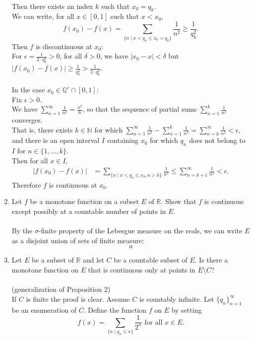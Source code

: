\begin{enumerate}
    \\Then there exists an index $k$ such that $x_0=q_k$.
    \\We can write, for all $x\in[0,1]$ such that $x<x_0$,
    \[
        f(x_0)-f(x)=\sum_{\{n\mid x<q_n\le x_0=q_k\}}\frac{1}{n^2}\ge\frac{1}{q_k^2}.
    \]
    Then $f$ is discontinuous at $x_0$:
    \\For $\epsilon=\frac{1}{2\cdot q_k^2}>0$, for all $\delta>0$, we have $|x_0-x|<\delta$ but $|f(x_0)-f(x)|\ge\frac{1}{q_k^2}>\frac{1}{2\cdot q_k^2}$.\\
    \\In the case $x_0\in\mathbb{Q}^c\cap[0,1]$:
    \\Fix $\epsilon>0$.
    \\We have $\sum_{n=1}^\infty\frac{1}{n^2}=\frac{\pi^2}{6}$, so that the sequence of partial sums $\sum_{n=1}^k\frac{1}{n^2}$ converges.
    \\That is, there exists $k\in\mathbb{N}$ for which $\sum_{n=1}^\infty\frac{1}{n^2}-\sum_{n=1}^k\frac{1}{n^2}=\sum_{n=k}^\infty\frac{1}{n^2}<\epsilon$, and there is an open interval $I$ containing $x_0$ for which $q_n$ does not belong to $I$ for $n\in\{1,\dots,k\}$.
    \\Then for all $x\in I$,
    \begin{align*}
        |f(x_0)-f(x)|&=\sum_{\{n\mid x< q_n\le x_0,n>k\}}\frac{1}{n^2}
        \le\sum_{n={k+1}}^\infty\frac{1}{n^2}
        <\epsilon.
    \end{align*}
    Therefore $f$ is continuous at $x_0$.
    \item Let $f$ be a monotone function on a subset $E$ of $\mathbb{R}$. Show that $f$ is continuous except possibly at a countable number of points in $E$.\\
    \\By the $\sigma$-finite property of the Lebesgue measure on the reals, we can write $E$ as a disjoint union of sets of finite measure:
    \[
        a
    \]
    \item Let $E$ be a subset of $\mathbb{R}$ and let $C$ be a countable subset of $E$. Is there a monotone function on $E$ that is continuous only at points in $E\setminus C$?\\
    \\(generalization of Proposition 2)
    \\If $C$ is finite the proof is clear.
    Assume $C$ is countably infinite.
    Let $\{q_n\}_{n=1}^\infty$ be an enumeration of $C$.
    Define the function $f$ on $E$ by setting
    \[
        f(x)=\sum_{\{n\mid q_n\le x\}}\frac{1}{2^n}\text{ for all }x\in E.
\]
\end{enumerate}
